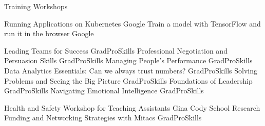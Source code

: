 \begin{rubric}{Training Workshops}

    \entry*[May 2019] Running Applications on Kubernetes \hfill Google
    \entry*[May 2019] Train a model with TensorFlow and run it in the browser \hfill Google

    \entry*[Oct 2017] Leading Teams for Success \hfill GradProSkills
    \entry*[Oct 2017] Professional Negotiation and Persuasion Skills \hfill GradProSkills
    \entry*[Oct 2017] Managing People's Performance \hfill GradProSkills
    \entry*[Oct 2017] Data Analytics Essentials: Can we always trust numbers? \hfill GradProSkills
    \entry*[Sep 2017] Solving Problems and Seeing the Big Picture \hfill GradProSkills
    \entry*[Sep 2017] Foundations of Leadership \hfill GradProSkills
    \entry*[Sep 2017] Navigating Emotional Intelligence \hfill GradProSkills


    \entry*[Aug 2017] Health and Safety Workshop for Teaching Assistants \hfill Gina Cody School
    \entry*[Feb 2017] Research Funding and Networking Strategies with Mitacs \hfill GradProSkills

\end{rubric}
